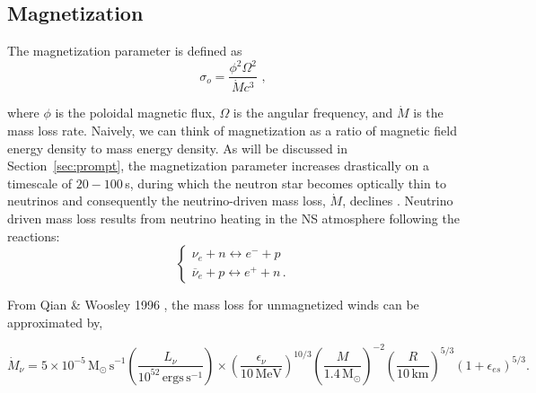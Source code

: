 \documentclass{article}
\begin{document}
\subsection{Magnetization} \label{sec:magnetization}

The magnetization parameter is defined as
\begin{equation}
\sigma_o= \frac{\phi^2 \Omega^2}{\dot{M} c^3}\,\,,
\end{equation}

where $\phi$ is the poloidal  magnetic flux, $\Omega$ is the angular frequency, and $\dot{M}$ is the mass loss rate. Naively, we can think of magnetization as a ratio of magnetic field energy density to mass energy density. As will be discussed in Section~\ref{sec:prompt}, the magnetization parameter increases drastically on a timescale of $20-100$\,s, during which the neutron star becomes optically thin to neutrinos and consequently the neutrino-driven mass loss, $\dot{M}$, declines \cite{Metzger:2010pp}. Neutrino driven mass loss results from neutrino heating in the NS atmosphere following the reactions:
\begin{equation}
\begin{cases}
\nu_e+ n \leftrightarrow e^- + p \\ \overline{\nu}_e+p \leftrightarrow e^+ + n \,.
\end{cases}
\end{equation}

From Qian \&  Woosley 1996 \cite{QianWoos:1996ap}, the mass loss for unmagnetized winds can be approximated by,

\begin{equation}
\dot{M}_\nu = 5 \times 10^{-5}\,\mathrm{M_{\odot}\, s}^{-1} \left(\frac{L_\nu}{10^{52}\, \mathrm{ergs\, s}^{-1}}\right) \times \left(\frac{\epsilon_\nu}{10\, \mathrm{MeV}}\right)^{10/3} \left(\frac{M}{1.4\, \mathrm{M}_{\odot}}\right)^{-2} \left(\frac{R}{10\, \mathrm{km}}\right)^{5/3}\left(1+ \epsilon_{es}\right)^{5/3}.
\end{equation}
\end{document}
